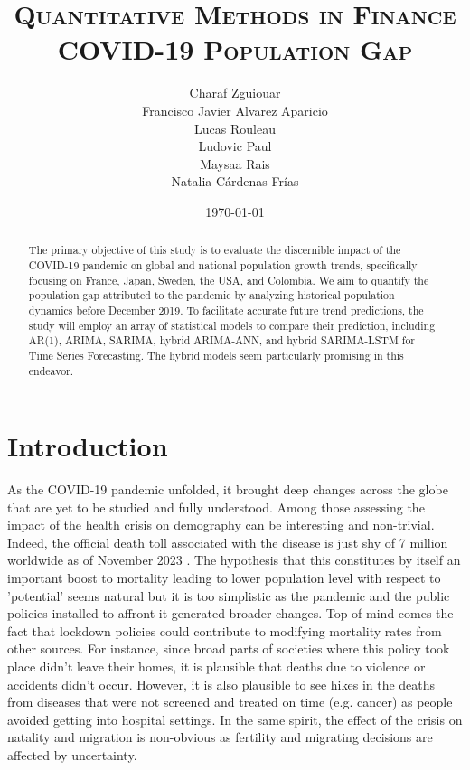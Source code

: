 \documentclass[hidelinks,11pts]{article}
\DeclareMathOperator{\1}{\mathbbm{1}}
\begin{document}
        \title{\scshape{Quantitative Methods in Finance \\ COVID-19 Population Gap }}%
        \author{Charaf Zguiouar\\
        Francisco Javier Alvarez Aparicio
        \\Lucas Rouleau
        \\Ludovic Paul
        \\Maysaa Rais 
        \\Natalia Cárdenas Frías}
        \date{\today}
        \maketitle 

\begin{abstract}
    The primary objective of this study is to evaluate the discernible impact of the COVID-19 pandemic on global and national population growth trends, specifically focusing on France, Japan, Sweden, the USA, and Colombia. We aim to quantify the population gap attributed to the pandemic by analyzing historical population dynamics before December 2019. To facilitate accurate future trend predictions, the study will employ an array of statistical models to compare their prediction, including AR(1), ARIMA, SARIMA, hybrid ARIMA-ANN, and hybrid SARIMA-LSTM for Time Series Forecasting. The hybrid models seem particularly promising in this endeavor. 
\end{abstract}

\newpage
\section*{Introduction}
As the COVID-19 pandemic unfolded, it brought deep changes across the globe that are yet to be studied and fully understood. 
Among those assessing the impact of the health crisis on demography can be interesting and non-trivial. 
Indeed, the official death toll associated with the disease is just shy of 7 million worldwide as of November 2023 \citep{WHOCoronavirusCOVID19}. 
The hypothesis that this constitutes by itself an important boost to mortality leading to lower population level with respect to 'potential' seems natural but it is too simplistic as the pandemic and the public policies installed to affront it generated broader changes. 
Top of mind comes the fact that lockdown policies could contribute to modifying mortality rates from other sources. 
For instance, since broad parts of societies where this policy took place didn't leave their homes, it is plausible that deaths due to violence or accidents didn't occur. 
However, it is also plausible to see hikes in the deaths from diseases that were not screened and treated on time (e.g. cancer) as people avoided getting into hospital settings. 
In the same spirit, the effect of the crisis on natality and migration is non-obvious as fertility and migrating decisions are affected by uncertainty. 
\end{document}
